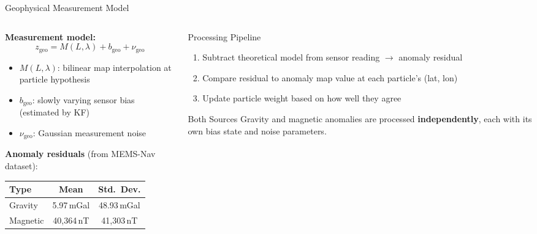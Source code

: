 \documentclass[aspectratio=169]{beamer}
\begin{document}
\begin{frame}{Geophysical Measurement Model}
    \begin{columns}
        \begin{column}{0.55\textwidth}
            \textbf{Measurement model:}
            \[
            z_\text{geo} = M(L, \lambda) + b_\text{geo} + \nu_\text{geo}
            \]
            \begin{itemize}
                \item $M(L,\lambda)$: bilinear map interpolation at particle hypothesis
                \item $b_\text{geo}$: slowly varying sensor bias (estimated by KF)
                \item $\nu_\text{geo}$: Gaussian measurement noise
            \end{itemize}

            \vspace{0.5em}
            \textbf{Anomaly residuals} (from MEMS-Nav dataset):

            \begin{table}
                \small
                \begin{tabular}{lcc}
                    \toprule
                    Type & Mean & Std.\ Dev. \\
                    \midrule
                    Gravity & 5.97\,mGal & 48.93\,mGal \\
                    Magnetic & 40,364\,nT & 41,303\,nT \\
                    \bottomrule
                \end{tabular}
            \end{table}
        \end{column}
        \begin{column}{0.42\textwidth}
            \begin{block}{Processing Pipeline}
                \small
                \begin{enumerate}
                    \item Subtract theoretical model from sensor reading $\rightarrow$ anomaly residual
                    \item Compare residual to anomaly map value at each particle's (lat, lon)
                    \item Update particle weight based on how well they agree
                \end{enumerate}
            \end{block}
            \vspace{0.4em}
            \begin{block}{Both Sources}
                \small
                Gravity and magnetic anomalies are processed \textbf{independently}, each with its own bias state and noise parameters.
            \end{block}
        \end{column}
    \end{columns}
\end{frame}
\end{document}
